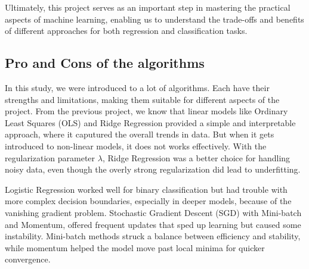 Ultimately, this project serves as an important step in mastering the practical aspects of machine learning, enabling us to understand the trade-offs and benefits of different approaches for both regression and classification tasks.




\subsection{Pro and Cons of the algorithms }

In this study, we were introduced to a lot of algorithms. Each have their strengths and limitations, making them suitable for different aspects of the project. From the previous project, we know that linear models like Ordinary Least Squares (OLS) and Ridge Regression provided a simple and interpretable approach, where it caputured the overall trends in data. But when it gets introduced to non-linear models, it does not works effectively. With the regularization parameter \(\lambda\), Ridge Regression was a better choice for handling noisy data, even though the overly strong regularization did lead to underfitting. 

Logistic Regression worked well for binary classification but had trouble with more complex decision boundaries, especially in deeper models, because of the vanishing gradient problem. Stochastic Gradient Descent (SGD) with Mini-batch and Momentum, offered frequent updates that sped up learning but caused some instability. Mini-batch methods struck a balance between efficiency and stability, while momentum helped the model move past local minima for quicker convergence.





